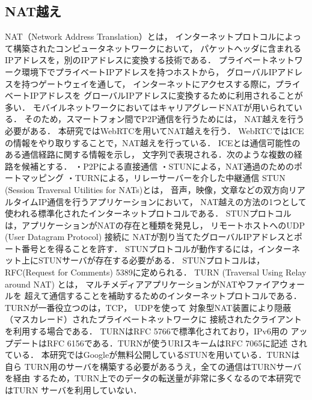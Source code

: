 \documentclass[sotsuron]{jcsie}
\begin{document}
\subsection{NAT越え}
NAT（Network Address Translation）とは，
インターネットプロトコルによって構築されたコンピュータネットワークにおいて，
パケットヘッダに含まれるIPアドレスを，別のIPアドレスに変換する技術である．
プライベートネットワーク環境下でプライベートIPアドレスを持つホストから，
グローバルIPアドレスを持つゲートウェイを通して，
インターネットにアクセスする際に，プライベートIPアドレスを
グローバルIPアドレスに変換するために利用されることが多い．
モバイルネットワークにおいてはキャリアグレードNATが用いられている．
そのため，スマートフォン間でP2P通信を行うためには，
NAT越えを行う必要がある．
本研究ではWebRTCを用いてNAT越えを行う．
WebRTCではICEの情報をやり取りすることで，NAT越えを行っている．
ICEとは通信可能性のある通信経路に関する情報を示し，
文字列で表現される．次のような複数の経路を候補とする．
・P2Pによる直接通信
・STUNによる，NAT通過のためのポートマッピング
・TURNによる，リレーサーバーを介した中継通信
STUN (Session Traversal Utilities for NATs)とは，
音声，映像，文章などの双方向リアルタイムIP通信を行うアプリケーションにおいて，
NAT越えの方法の1つとして使われる標準化されたインターネットプロトコルである．
STUNプロトコルは，アプリケーションがNATの存在と種類を発見し，
リモートホストへのUDP (User Datagram Protocol) 接続に
NATが割り当てたグローバルIPアドレスとポート番号とを得ることを許す．
STUNプロトコルが動作するには，インターネット上にSTUNサーバが存在する必要がある．
STUNプロトコルは，RFC(Request for Comments) 5389に定められる．
TURN (Traversal Using Relay around NAT) とは，
マルチメディアアプリケーションがNATやファイアウォールを
超えて通信することを補助するためのインターネットプロトコルである．
TURNが一番役立つのは，TCP， UDPを使って
対象型NAT装置により隠蔽（マスカレード）されたプライベートネットワークに
接続されたクライアントを利用する場合である．
TURNはRFC 5766で標準化されており，IPv6用の
アップデートはRFC 6156である．TURNが使うURIスキームはRFC 7065に記述
されている．
本研究ではGoogleが無料公開しているSTUNを用いている．TURNは自ら
TURN用のサーバを構築する必要があるうえ，全ての通信はTURNサーバを経由
するため，TURN上でのデータの転送量が非常に多くなるので本研究ではTURN
サーバを利用していない．
\end{document}
